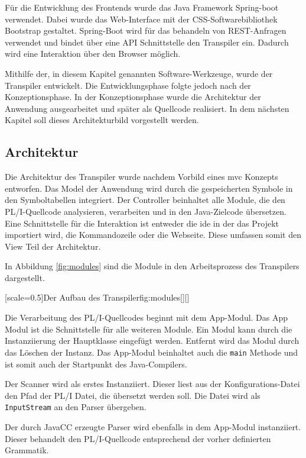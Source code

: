 Für die Entwicklung des Frontends wurde das Java Framework Spring-boot verwendet.
Dabei wurde das Web-Interface mit der CSS-Softwarebibliothek Bootstrap gestaltet.
Spring-Boot wird für das behandeln von REST-Anfragen verwendet und bindet über eine API Schnittstelle den Transpiler ein.
Dadurch wird eine Interaktion über den Browser möglich.

Mithilfe der, in diesem Kapitel genannten Software-Werkzeuge, wurde der Transpiler entwickelt. Die Entwicklungsphase folgte jedoch nach der Konzeptionsphase.
In der Konzeptionsphase wurde die Architektur der Anwendung ausgearbeitet und später als Quellcode realisiert. 
In dem nächsten Kapitel soll dieses Architekturbild vorgestellt werden.

\subsection{Architektur} 

Die Architektur des Transpiler wurde nachdem Vorbild eines \ac{mvc} Konzepts entworfen. 
Das Model der Anwendung wird durch die gespeicherten Symbole in den Symboltabellen integriert.
Der Controller beinhaltet alle Module, die den PL/I-Quellcode analysieren, verarbeiten und in den Java-Zielcode übersetzen.
Eine Schnittstelle für die Interaktion ist entweder die \ac{ide} in der das Projekt importiert wird, die Kommandozeile oder die Webseite. Diese umfassen somit den View Teil der Architektur.

In Abbildung \ref{fig:modules} sind die Module in den Arbeitsprozess des Transpilers dargestellt.

[scale=0.5]{Der Aufbau des Transpiler}{fig:modules}[][]

Die Verarbeitung des PL/I-Quellcodes beginnt mit dem App-Modul. Das App Modul ist die Schnittstelle für alle weiteren Module. Ein Modul kann durch die Instanziierung der Hauptklasse eingefügt werden. Entfernt wird das Modul durch das Löschen der Instanz. Das App-Modul beinhaltet auch die \verb+main+ Methode und ist somit auch der Startpunkt des Java-Compilers.

Der Scanner wird als erstes Instanziiert. Dieser liest aus der Konfigurations-Datei den Pfad der PL/I Datei, die übersetzt werden soll. Die Datei wird als \verb+InputStream+ an den Parser übergeben.

Der durch JavaCC erzeugte Parser wird ebenfalls in dem App-Modul instanziiert. Dieser behandelt den PL/I-Quellcode entsprechend der vorher definierten Grammatik. 

